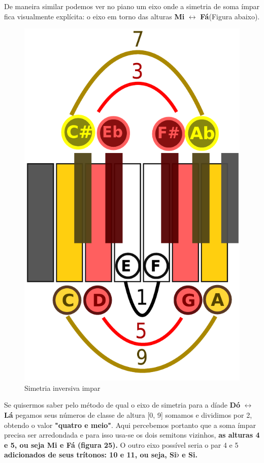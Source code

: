 \documentclass[
	12pt,				%
	openright,			%
	twoside,			%
	a4paper,			%
	english,			%
	french,				%
	spanish,			%
	brazil				%
	]{abntex2}
\begin{document}
De maneira similar podemos ver no piano um eixo onde a simetria de soma ímpar fica visualmente explícita: o eixo em torno das alturas \textbf{Mi} $\leftrightarrow $  \textbf{Fá}(Figura abaixo).

\begin{figure}[!h]
	\caption{\label{fig_grafico}Simetria inversiva impar}
	\begin{center}
	    \includegraphics[scale=0.4]{axis/simetriainversiva_impar.pdf}
	\end{center}
\end{figure}

Se quisermos saber pelo método de  qual o eixo de simetria para a díade \textbf{Dó} $\leftrightarrow $ \textbf{Lá} pegamos seus números de classe de altura [0, 9] somamos e dividimos por 2, obtendo o valor \textbf{"quatro e meio"}. Aqui percebemos portanto que a soma ímpar precisa ser arredondada e para isso usa-se os dois semitons vizinhos, \textbf{as alturas 4 e 5, ou seja Mi e Fá (figura 25).} 
O outro eixo possível seria o par 4 e 5 \textbf{adicionados de seus trítonos: 10 e 11, ou seja, Si$\flat $ e Si.}
\end{document}
